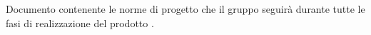 Documento contenente le norme di progetto che il gruppo \textit{\gruppo} seguirà durante tutte le fasi di realizzazione del prodotto \textit{\progetto}.
